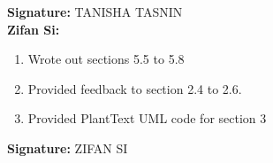 \documentclass[]{article}
\begin{document}
\textbf{Signature:} TANISHA TASNIN \\

\textbf{Zifan Si:}
\begin{enumerate}
	\item Wrote out sections 5.5 to 5.8
	\item Provided feedback to section 2.4 to 2.6.
	\item Provided PlantText UML code for section 3
\end{enumerate}

\textbf{Signature:} ZIFAN SI  \\

\end{document}
